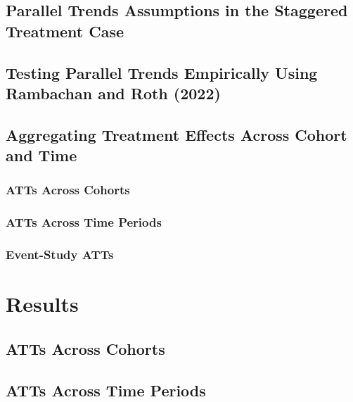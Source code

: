 \documentclass[12pt]{article}
\begin{document}
    \subsection{Parallel Trends Assumptions in the Staggered Treatment Case}
        
        \subsection{Testing Parallel Trends Empirically Using Rambachan and Roth (2022)}
    \subsection{Aggregating Treatment Effects Across Cohort and Time}
        \subsubsection{ATTs Across Cohorts}
        \subsubsection{ATTs Across Time Periods}
        \subsubsection{Event-Study ATTs}
    
\section{Results} \label{sec:result}
    \subsection{ATTs Across Cohorts}
    \subsection{ATTs Across Time Periods}
\end{document}
